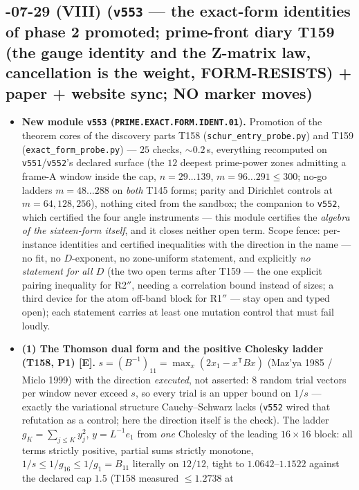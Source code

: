 \documentclass[11pt]{article}
\providecommand{\mE}{\textbf{[E]}}\providecommand{\mC}{\textbf{[C]}}
\begin{document}
\subsection*{-07-29 (VIII) (\texttt{v553} --- the exact-form identities of phase 2 promoted; prime-front diary T159 (the gauge identity and the Z-matrix law, cancellation is the weight, FORM-RESISTS) + paper + website sync; NO marker moves)}
\begin{itemize}[leftmargin=1.5em]
\item \textbf{New module \texttt{v553} (\texttt{PRIME.EXACT.FORM.IDENT.01}).} Promotion of
the theorem cores of the discovery parts T158 (\texttt{schur\_entry\_probe.py}) and T159
(\texttt{exact\_form\_probe.py}) --- $25$ checks, ${\sim}0.2$\,s, everything recomputed on
\texttt{v551}/\texttt{v552}'s declared surface (the $12$ deepest prime-power zones
admitting a frame-A window inside the cap, $n=29\ldots139$, $m=96\ldots291\le300$; no-go
ladders $m=48\ldots288$ on \emph{both} T145 forms; parity and Dirichlet controls at
$m=64,128,256$), nothing cited from the sandbox; the companion to \texttt{v552}, which
certified the four angle instruments --- this module certifies the \emph{algebra of the
sixteen-form itself}, and it closes neither open term. Scope fence: per-instance
identities and certified inequalities with the direction in the name --- no fit, no
$D$-exponent, no zone-uniform statement, and explicitly \emph{no statement for all $D$}
(the two open terms after T159 --- the one explicit pairing inequality for R2$''$, needing
a correlation bound instead of sizes; a third device for the atom off-band block for
R1$''$ --- stay open and typed open); each statement carries at least one mutation
control that must fail loudly.
\item \textbf{(1) The Thomson dual form and the positive Cholesky ladder (T158, P1) \mE.}
$s=(B^{-1})_{11}=\max_x(2x_1-x^{\mathsf T}Bx)$ (Maz'ya 1985 / Miclo 1999) with the
direction \emph{executed}, not asserted: $8$ random trial vectors per window never exceed
$s$, so every trial is an upper bound on $1/s$ --- exactly the variational structure
Cauchy--Schwarz lacks (\texttt{v552} wired that refutation as a control; here the
direction itself is the check). The ladder $g_K=\sum_{j\le K}y_j^2$, $y=L^{-1}e_1$ from
\emph{one} Cholesky of the leading $16\times16$ block: all terms strictly positive,
partial sums strictly monotone, $1/s\le1/g_{16}\le1/g_1=B_{11}$ literally on $12/12$,
tight to $1.0642$--$1.1522$ against the declared cap $1.5$ (T158 measured $\le1.2738$ at

\end{itemize}
\end{document}
